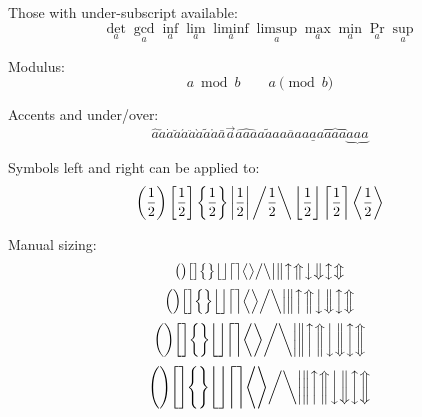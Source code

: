 Those with under-subscript available:
\begin{dmath}[compact,spread={1.250000\baselineskip}] \det_{a} \gcd_{a} \inf_{a} \lim_{a} \liminf_{a} \limsup_{a} \max_{a} \min_{a} \Pr_{a} \sup_{a} \end{dmath}

Modulus:
\begin{dmath}[compact,spread={1.250000\baselineskip}] a \bmod b \qquad a \pmod{b} \end{dmath}

Accents and under/over:
\begin{dmath}[compact,spread={1.250000\baselineskip}] \hat{a} \check{a} \dot{a} \breve{a} \acute{a} \ddot{a} \grave{a} \tilde{a} \mathring{a} \bar{a} \vec{a} \widehat{aaa} \widetilde{aaa} \overline{aaa} \underline{aaa} \overbrace{aaa} \underbrace{aaa} \end{dmath}

Symbols left and right can be applied to:
\begin{dmath}[compact,spread={1.250000\baselineskip}] \left( \frac{1}{2} \right) \left[ \frac{1}{2} \right] \left\{ \frac{1}{2} \right\} \left| \frac{1}{2} \right| \left/ \frac{1}{2} \right\backslash \left\lfloor \frac{1}{2} \right\rfloor \left\lceil \frac{1}{2} \right\rceil \left\langle \frac{1}{2} \right\rangle    \end{dmath}

Manual sizing:
\begin{dmath}[compact,spread={1.250000\baselineskip}] \big( \big) \big[ \big] \big\{ \big\} \big\lfloor \big\rfloor \big\lceil \big\rceil \big\langle \big\rangle  \big/ \big\backslash \big| \big\| \big\uparrow \big\Uparrow \big\downarrow \big\Downarrow \big\updownarrow \big\Updownarrow \end{dmath}
\begin{dmath}[compact,spread={1.250000\baselineskip}] \Big( \Big) \Big[ \Big] \Big\{ \Big\} \Big\lfloor \Big\rfloor \Big\lceil \Big\rceil \Big\langle \Big\rangle  \Big/ \Big\backslash \Big| \Big\| \Big\uparrow \Big\Uparrow \Big\downarrow \Big\Downarrow \Big\updownarrow \Big\Updownarrow \end{dmath}
\begin{dmath}[compact,spread={1.250000\baselineskip}] \bigg( \bigg) \bigg[ \bigg] \bigg\{ \bigg\} \bigg\lfloor \bigg\rfloor \bigg\lceil \bigg\rceil \bigg\langle \bigg\rangle  \bigg/ \bigg\backslash \bigg| \bigg\| \bigg\uparrow \bigg\Uparrow \bigg\downarrow \bigg\Downarrow \bigg\updownarrow \bigg\Updownarrow \end{dmath}
\begin{dmath}[compact,spread={1.250000\baselineskip}] \Bigg( \Bigg) \Bigg[ \Bigg] \Bigg\{ \Bigg\} \Bigg\lfloor \Bigg\rfloor \Bigg\lceil \Bigg\rceil \Bigg\langle \Bigg\rangle  \bigg/ \bigg\backslash \bigg| \bigg\| \bigg\uparrow \bigg\Uparrow \bigg\downarrow \bigg\Downarrow \bigg\updownarrow \bigg\Updownarrow \end{dmath}

